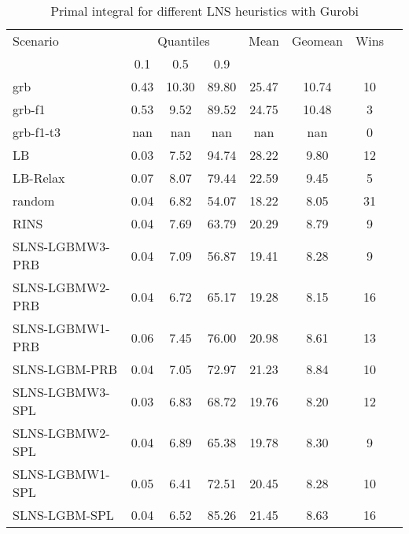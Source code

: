 \documentclass[3p, authoryear, times]{elsarticle}
\begin{document}
\begin{table}[h]
\centering
\caption{Primal integral for different LNS heuristics with Gurobi}
\label{tab:lns:primal_integral_grb}
\begin{tabular}{lccccccc}
\toprule
{Scenario} & \multicolumn{3}{c}{Quantiles} & {Mean} & {Geomean} & {Wins} \\
{} & {0.1} & {0.5} & {0.9} & {} & {} & {} \\
\midrule
grb & 0.43 & 10.30 & 89.80 & 25.47 & 10.74 & 10 \\
grb-f1 & 0.53 & 9.52 & 89.52 & 24.75 & 10.48 & 3 \\
grb-f1-t3 & nan & nan & nan & nan & nan & 0 \\
LB & 0.03 & 7.52 & 94.74 & 28.22 & 9.80 & 12 \\
LB-Relax & 0.07 & 8.07 & 79.44 & 22.59 & 9.45 & 5 \\
random & 0.04 & 6.82 & 54.07 & 18.22 & 8.05 & 31 \\
RINS & 0.04 & 7.69 & 63.79 & 20.29 & 8.79 & 9 \\
SLNS-LGBMW3-PRB & 0.04 & 7.09 & 56.87 & 19.41 & 8.28 & 9 \\
SLNS-LGBMW2-PRB & 0.04 & 6.72 & 65.17 & 19.28 & 8.15 & 16 \\
SLNS-LGBMW1-PRB & 0.06 & 7.45 & 76.00 & 20.98 & 8.61 & 13 \\
SLNS-LGBM-PRB & 0.04 & 7.05 & 72.97 & 21.23 & 8.84 & 10 \\
SLNS-LGBMW3-SPL & 0.03 & 6.83 & 68.72 & 19.76 & 8.20 & 12 \\
SLNS-LGBMW2-SPL & 0.04 & 6.89 & 65.38 & 19.78 & 8.30 & 9 \\
SLNS-LGBMW1-SPL & 0.05 & 6.41 & 72.51 & 20.45 & 8.28 & 10 \\
SLNS-LGBM-SPL & 0.04 & 6.52 & 85.26 & 21.45 & 8.63 & 16 \\
\bottomrule
\end{tabular}
\end{table}
\end{document}
